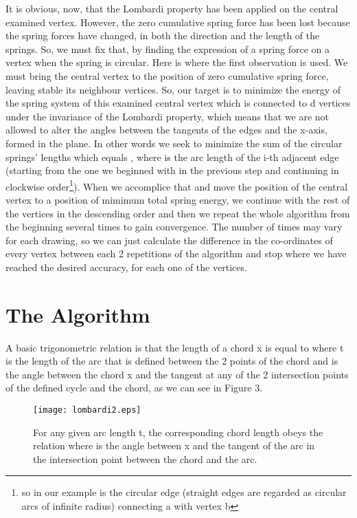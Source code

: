 \documentclass[10pt]{article}
\begin{document}
It is obvious, now, that the Lombardi property has been applied on the central examined vertex. However, the zero cumulative spring force has been lost because the spring forces have changed, in both the direction and the length of the springs. So, we must fix that, by finding the expression of a spring force on a vertex when the spring is circular. Here is where the first observation is used. We must bring the central vertex to the position of zero cumulative spring force, leaving stable its neighbour vertices. So, our target is to minimize the energy of the spring system of this examined central vertex which is connected to d vertices under the invariance of the Lombardi property, which means that we are not allowed to alter the angles between the tangents of the edges and the x-axis, formed in the plane. In other words we seek to minimize the sum of the circular springs' lengths which equals , where  is the arc length of the i-th adjacent edge (starting from the one we beginned with in the previous step and continuing in clockwise order\footnote{so in our example  is the circular edge (straight edges are regarded as circular arcs of infinite radius) connecting a with vertex b}). When we accomplice that and move the position of the central vertex to a position of mimimum total spring energy, we continue with the rest of the vertices in the descending order and then we repeat the whole algorithm from the beginning several times to gain convergence. The number of times may vary for each drawing, so we can just calculate the difference in the co-ordinates of every vertex between each 2 repetitions of the algorithm and stop where we have reached the desired accuracy, for each one of the vertices.

\section {The Algorithm}

A basic trigonometric relation is that the length of a chord x is equal to  where t is the length of the arc that is defined between the 2 points of the chord and  is the angle between the chord x and the tangent at any of the 2 intersection points of the defined cycle and the chord, as we can see in Figure 3.

\begin{figure}
\begin{center}
\texttt{[image: lombardi2.eps]}
\end{center}
\caption{For any given arc length t, the corresponding chord length obeys the relation  where  is the angle between x and the tangent of the arc in the intersection point between the chord and the arc.}
\end{figure}
\end{document}
